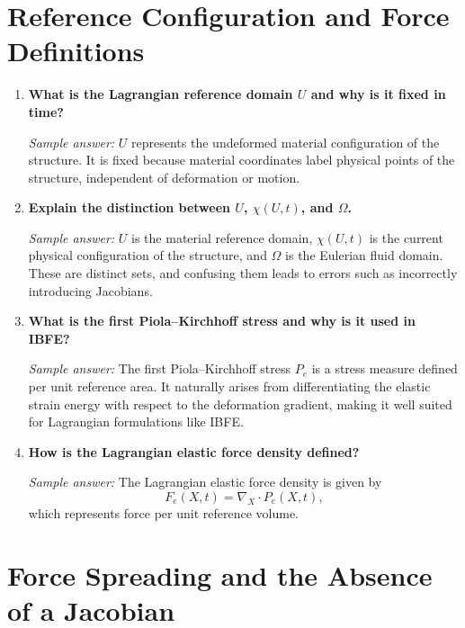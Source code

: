 \documentclass[11pt]{article}
\begin{document}
\section*{Reference Configuration and Force Definitions}

\begin{enumerate}[label=\arabic*., resume]

\item \textbf{What is the Lagrangian reference domain $U$ and why is it fixed in time?}

\textit{Sample answer:}  
$U$ represents the undeformed material configuration of the structure. It is fixed because material coordinates label physical points of the structure, independent of deformation or motion.

\item \textbf{Explain the distinction between $U$, $\chi(U,t)$, and $\Omega$.}

\textit{Sample answer:}  
$U$ is the material reference domain, $\chi(U,t)$ is the current physical configuration of the structure, and $\Omega$ is the Eulerian fluid domain. These are distinct sets, and confusing them leads to errors such as incorrectly introducing Jacobians.

\item \textbf{What is the first Piola--Kirchhoff stress and why is it used in IBFE?}

\textit{Sample answer:}  
The first Piola--Kirchhoff stress $P_e$ is a stress measure defined per unit reference area. It naturally arises from differentiating the elastic strain energy with respect to the deformation gradient, making it well suited for Lagrangian formulations like IBFE.

\item \textbf{How is the Lagrangian elastic force density defined?}

\textit{Sample answer:}  
The Lagrangian elastic force density is given by
\[
F_e(X,t) = \nabla_X \cdot P_e(X,t),
\]
which represents force per unit reference volume.

\end{enumerate}

\section*{Force Spreading and the Absence of a Jacobian}
\end{document}
